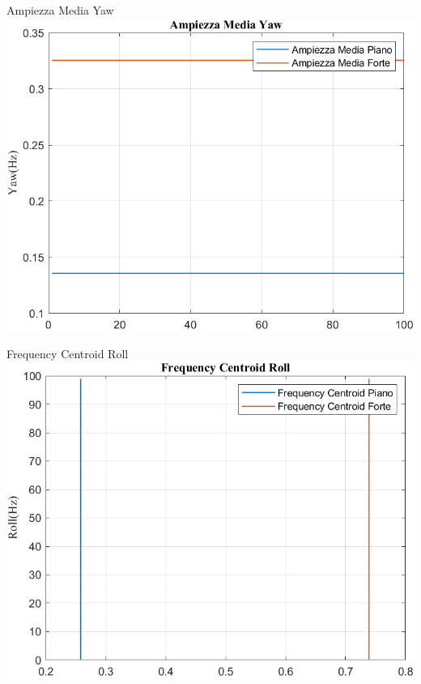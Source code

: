 \documentclass[beamer]{standalone}
\begin{document}
	\begin{frame}{{Ampiezza Media Yaw}}					
		\centering\includegraphics[height=.8\textheight]{figure/VAng/Trasformata/Ampiezza MediaYaw}
	\end{frame}
	
	\begin{frame}{{Frequency Centroid Roll}}
		\centering\includegraphics[height=.8\textheight]{figure/VAng/Trasformata/Frequency CentroidRoll}
	\end{frame}
	
\end{document}

